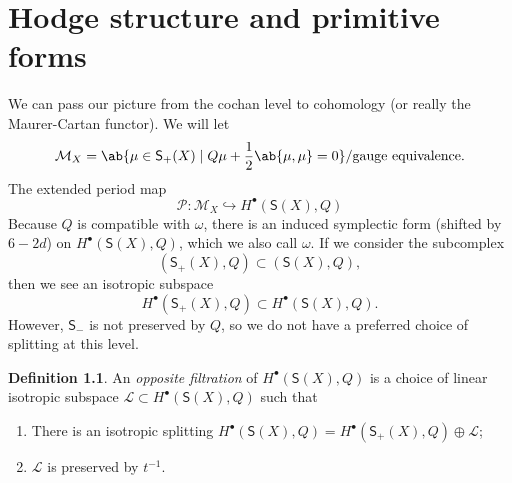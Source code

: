 \documentclass[article,10pt,oneside,oldfontcommands]{memoir}
\theoremstyle{definition}
\newtheorem{defn}[thm]{Definition}
\theoremstyle{remark}
\theoremstyle{plain}
\theoremstyle{definition}
\theoremstyle{remark}
\newcommand{\mc}[1]{\mathcal{#1}}
\newcommand{\ms}[1]{\mathsf{#1}}
\newcommand{\1}{\mathbf{1}}
\newcommand{\2}{\mathbf{2}}
\newcommand{\3}{\mathbf{3}}
\begin{document}
\chapter{Hodge structure and primitive forms}%
\label{cha:Hodge structure and primitive forms}

We can pass our picture from the cochan level to cohomology (or really the Maurer-Cartan functor). We will let
\[ \mc{M}_X = \ab\{ \mu \in \ms{S}_+(X) \mid Q \mu + \frac{1}{2} \ab\{ \mu, \mu \} = 0 \} / \text{gauge equivalence}. \]
The extended period map
\[ \mc{P} \colon \mc{M}_X \hookrightarrow H^{\bullet}(\ms{S}(X), Q) \]
Because \(Q\) is compatible with \(\omega\), there is an induced symplectic form (shifted by \(6-2d\)) on \(H^{\bullet}(\ms{S}(X), Q)\), which we also call \(\omega\). If we consider the subcomplex
\[ (\ms{S}_+(X), Q) \subset (\ms{S}(X), Q), \]
then we see an isotropic subspace
\[ H^{\bullet}(\ms{S}_+(X), Q) \subset H^{\bullet}(\ms{S}(X), Q). \]
However, \(\ms{S}_-\) is not preserved by \(Q\), so we do not have a preferred choice of splitting at this level.

\begin{defn}
    An \textit{opposite filtration} of \(H^{\bullet}(\ms{S}(X), Q)\) is a choice of linear isotropic subspace \(\mc{L} \subset H^{\bullet}(\ms{S}(X), Q)\) such that
    \begin{enumerate}
        \item There is an isotropic splitting \(H^{\bullet}(\ms{S}(X), Q) = H^{\bullet}(\ms{S}_+(X), Q) \oplus \mc{L}\);
        \item \(\mc{L}\) is preserved by \(t^{-1}\).
    \end{enumerate}
\end{defn}
\end{document}
